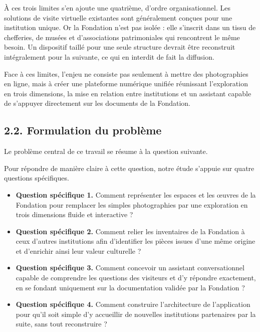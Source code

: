 À ces trois limites s'en ajoute une quatrième, d'ordre organisationnel. Les
solutions de visite virtuelle existantes sont généralement conçues pour une
institution unique. Or la Fondation n'est pas isolée : elle s'inscrit dans un
tissu de chefferies, de musées et d'associations patrimoniales qui rencontrent
le même besoin. Un dispositif taillé pour une seule structure devrait être
reconstruit intégralement pour la suivante, ce qui en interdit de fait la
diffusion.

Face à ces limites, l'enjeu ne consiste pas seulement à mettre des photographies
en ligne, mais à créer une plateforme numérique unifiée réunissant l'exploration
en trois dimensions, la mise en relation entre institutions et un assistant
capable de s'appuyer directement sur les documents de la Fondation.

\subsection*{2.2. Formulation du problème}

Le problème central de ce travail se résume à la question suivante.


Pour répondre de manière claire à cette question, notre étude s'appuie sur
quatre questions spécifiques.

\begin{itemize}[label={},leftmargin=0pt,itemsep=5pt,topsep=4pt,parsep=0pt]
  \item \textbf{Question spécifique 1.} Comment représenter les espaces et les œuvres de la
        Fondation pour remplacer les simples photographies par une exploration
        en trois dimensions fluide et interactive ?

  \item \textbf{Question spécifique 2.} Comment relier les inventaires de la Fondation à ceux
        d'autres institutions afin d'identifier les pièces issues d'une même
        origine et d'enrichir ainsi leur valeur culturelle ?

  \item \textbf{Question spécifique 3.} Comment concevoir un assistant conversationnel capable de
        comprendre les questions des visiteurs et d'y répondre exactement, en se
        fondant uniquement sur la documentation validée par la Fondation ?

  \item \textbf{Question spécifique 4.} Comment construire l'architecture de l'application pour
        qu'il soit simple d'y accueillir de nouvelles institutions partenaires
        par la suite, sans tout reconstruire ?
\end{itemize}

